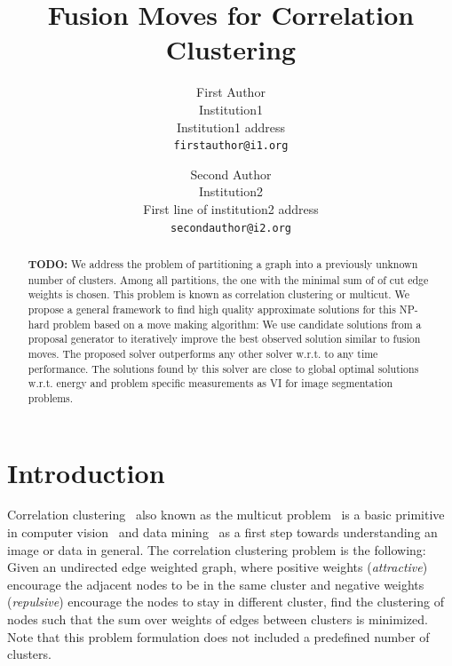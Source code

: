 \documentclass[10pt,twocolumn,letterpaper]{article}
\begin{document}

\title{Fusion Moves for Correlation Clustering}

\author{First Author\\
Institution1\\
Institution1 address\\
{\tt\small firstauthor@i1.org}
\and
Second Author\\
Institution2\\
First line of institution2 address\\
{\tt\small secondauthor@i2.org}
}

\maketitle


\begin{abstract}
  \color{red} \textbf{TODO:}
   We address the problem of partitioning a  graph
   into a previously unknown number of clusters.
   Among all partitions, the one with the minimal 
   sum of of cut edge weights is chosen. 
   This problem is known as correlation clustering 
   or multicut.
   We propose a general framework to find
   high quality approximate solutions for 
   this NP-hard problem based on a move making algorithm:
   We use candidate solutions from a proposal generator
   to iteratively improve the best observed solution similar
   to fusion moves.
   The proposed solver outperforms any other solver
   w.r.t. to any time performance.
   The solutions found by this solver are close
   to global optimal solutions w.r.t. energy
   and problem specific measurements as VI for
   image segmentation problems.

\end{abstract}
\section{Introduction}

Correlation clustering~\cite{Bansal-2002} also known as the multicut problem~\cite{chopra_1993_mp} 
is a basic primitive in computer vision~\cite{andres_2011_iccv,kroeger_2012_eccv,yarkony_2012_eccv,alush_2013_simbad} and data mining~\cite{Chierichetti-2014,Arasu-2009,Sadikov-2010} as a first step
towards understanding an image or data in general. 
The correlation clustering problem is the following:
Given an undirected edge weighted graph, 
where positive weights (\emph{attractive}) encourage the adjacent nodes to be in the same cluster
and negative weights (\emph{repulsive}) encourage the nodes to stay in different cluster, 
find the clustering of nodes such that the sum over weights of edges between clusters is minimized.
Note that this problem formulation does not included a predefined number of clusters.
\end{document}
